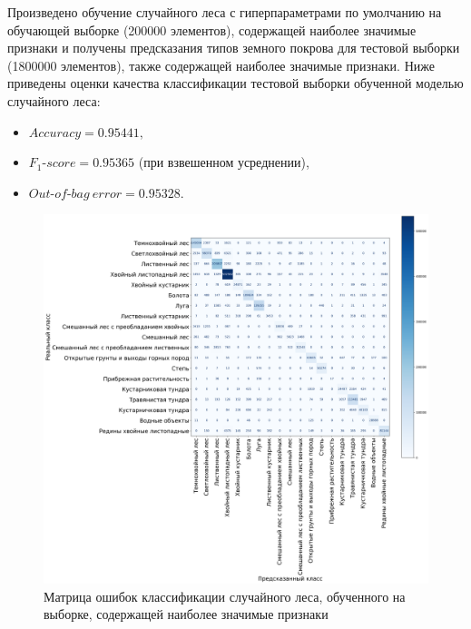 \documentclass[14pt, a4paper, oneside]{extarticle}
\begin{document}
Произведено обучение случайного леса с гиперпараметрами по умолчанию на обучающей выборке (200000 элементов), содержащей наиболее значимые признаки и получены предсказания типов земного покрова для тестовой выборки (1800000 элементов), также содержащей наиболее значимые признаки. Ниже приведены оценки качества классификации тестовой выборки обученной моделью случайного леса:
\begin{itemize}
    \item[] $Accuracy = 0.95441,$
    \item[] $F_1\mbox{-}score = 0.95365$ (при взвешенном усреднении),
    \item[] $Out\mbox{-}of\mbox{-}bag\ error = 0.95328.$
\end{itemize}

\begin{figure}[H]
    \caption{Матрица ошибок классификации случайного леса, обученного на выборке, содержащей наиболее значимые признаки}
    \centering
    \includegraphics[scale=0.33]{confusion-matrix-5}
\end{figure}
\end{document}
